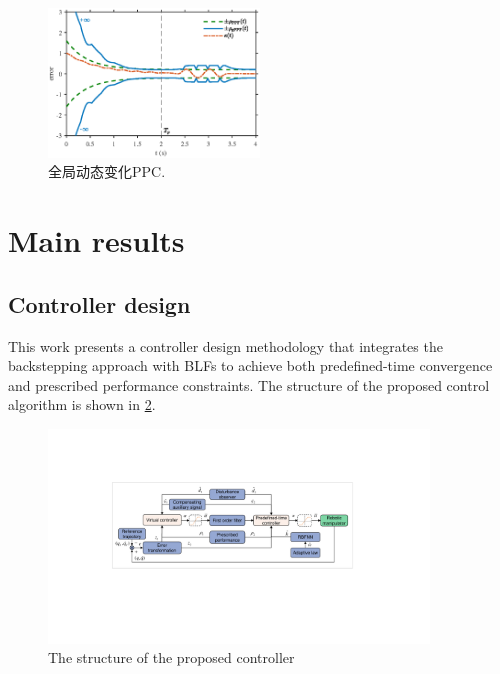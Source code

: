 \documentclass[pdflatex,sn-mathphys-num]{sn-jnl}%
\theoremstyle{thmstyleone}%
\theoremstyle{thmstyletwo}%
\theoremstyle{thmstylethree}%
\begin{document}
\begin{figure}[H]
	\centering
	\includegraphics[width=0.5\textwidth]{fig1.eps}
	\caption{全局动态变化PPC.}
	\label{fig:1}
\end{figure}
























\section{Main results}

\subsection{Controller design}
This work presents a controller design methodology that integrates the backstepping approach with BLFs to achieve both predefined-time convergence and prescribed performance constraints. The structure of the proposed control algorithm is shown in \cref{fig:2}.
\begin{figure}[H]
	\centering
	\includegraphics[width=0.9\textwidth]{fig2.pdf}
	\caption{The structure of the proposed controller}
	\label{fig:2}
\end{figure}
\end{document}
